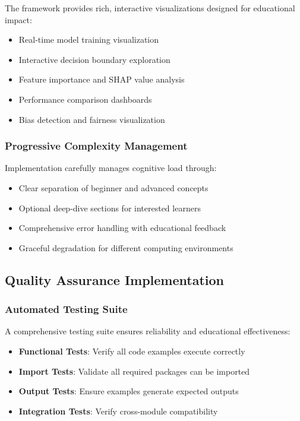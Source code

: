 The framework provides rich, interactive visualizations designed for educational impact:

\begin{itemize}
    \item Real-time model training visualization
    \item Interactive decision boundary exploration
    \item Feature importance and SHAP value analysis
    \item Performance comparison dashboards
    \item Bias detection and fairness visualization
\end{itemize}

\subsubsection{Progressive Complexity Management}

Implementation carefully manages cognitive load through:

\begin{itemize}
    \item Clear separation of beginner and advanced concepts
    \item Optional deep-dive sections for interested learners
    \item Comprehensive error handling with educational feedback
    \item Graceful degradation for different computing environments
\end{itemize}

\subsection{Quality Assurance Implementation}

\subsubsection{Automated Testing Suite}

A comprehensive testing suite ensures reliability and educational effectiveness:

\begin{itemize}
    \item \textbf{Functional Tests}: Verify all code examples execute correctly
    \item \textbf{Import Tests}: Validate all required packages can be imported
    \item \textbf{Output Tests}: Ensure examples generate expected outputs
    \item \textbf{Integration Tests}: Verify cross-module compatibility
\end{itemize}

